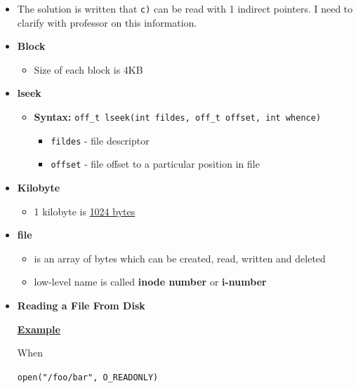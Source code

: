 \documentclass[12pt]{article}
\begin{document}
\begin{itemize}
    \item The solution is written that \texttt{c)} can be read with 1 indirect pointers.
    I need to clarify with professor on this information.
    \item \textbf{Block}

    \begin{itemize}
        \item Size of each block is 4KB
    \end{itemize}

    \item \textbf{lseek}

    \begin{itemize}
        \item \textbf{Syntax:} \texttt{off\_t lseek(int fildes, off\_t offset, int whence)}

        \begin{itemize}
            \item \texttt{fildes} - file descriptor
            \item \texttt{offset} - file offset to a particular position in file
        \end{itemize}
    \end{itemize}

    \item \textbf{Kilobyte}

    \begin{itemize}
        \item 1 kilobyte is \underline{1024 bytes}
    \end{itemize}

    \item \textbf{file}
    \begin{itemize}
        \item is an array of bytes which can be created, read, written and deleted
        \item low-level name is called \textbf{inode number} or \textbf{i-number}
    \end{itemize}
    \item \textbf{Reading a File From Disk}

    \bigskip

    \underline{\textbf{Example}}

    \bigskip

    When

    \bigskip

    \texttt{open("/foo/bar", O\_READONLY)}


\end{itemize}
\end{document}
